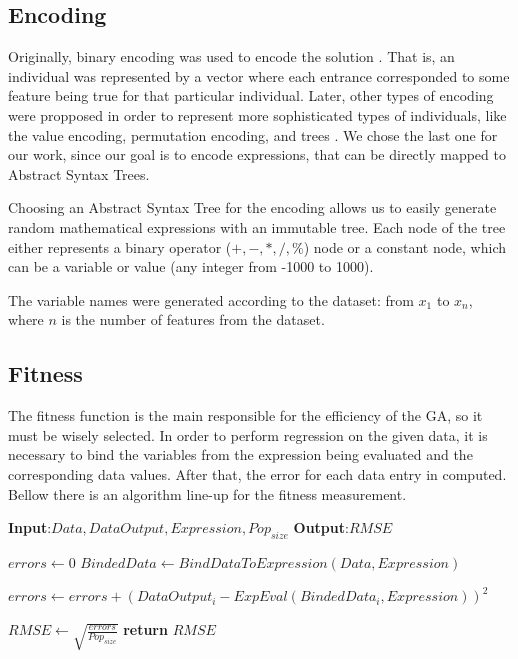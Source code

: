 \documentclass[runningheads]{llncs}
\begin{document}
\subsection{Encoding}


Originally, binary encoding was used to encode the solution \cite{whitley1994genetic}. That is, an individual was represented by a vector where each entrance corresponded to some feature being true for that particular individual. Later, other types of encoding were propposed in order to represent more sophisticated types of individuals, like the value encoding, permutation encoding, and trees \cite{martins2016gacuda}. We chose the last one for our work, since our goal is to encode expressions, that can be directly mapped to Abstract Syntax Trees.

Choosing an Abstract Syntax Tree for the encoding allows us to easily generate random mathematical expressions with an immutable tree. Each node of the tree either represents a binary operator ($+,-,*,/,\%$) node or a constant node, which can be a variable or value (any integer from -1000 to 1000).

The variable names were generated according to the dataset: from $x_{1}$ to $x_{n}$, where $n$ is the number of features from the dataset.

\subsection{Fitness}

The fitness function is the main responsible for the efficiency of the GA, so it must be wisely selected. In order to perform regression on the given data, it is necessary to bind the variables from the expression being evaluated and the corresponding data values. After that, the error for each data entry in computed. Bellow there is an algorithm line-up for the fitness measurement.

\begin{algorithmic}

   \State \textbf{Input}:$Data,DataOutput,Expression,Pop_{size}$
   \State \textbf{Output}:$RMSE$
   
   \State $errors \gets 0$
   \State $BindedData \gets BindDataToExpression(Data,Expression)$
   
      \State $errors \gets errors + (DataOutput_{i} - ExpEval(BindedData_{i},Expression))^2$
   \EndFor
   
   \State $RMSE \gets \sqrt{\frac{errors}{Pop_{size}}}$
   \State \textbf{return} $RMSE$
\end{algorithmic}
\end{document}
